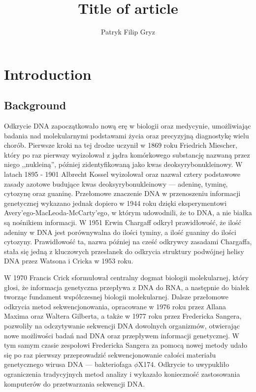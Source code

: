 \documentclass{article}
\newcommand{\temporary}[1]{
    \begin{tcolorbox}[colframe=red, colback=white, title={\textbf{WERSJA PO POLSKU}}, sharp corners=south]
        #1
    \end{tcolorbox}
}
\begin{document}
    \title{Title of article}
    \author{Patryk Filip Gryz}

    \maketitle

    \clearpage
    \section{Introduction}

        \subsection{Background}

            \temporary{
                Odkrycie DNA zapoczątkowało nową erę w biologii oraz medycynie, umożliwiając badania nad molekularnymi podstawami życia oraz precyzyjną diagnostykę wielu chorób\cite{Louie:2000}. Pierwsze kroki na tej drodze uczynił w 1869 roku Friedrich Miescher, który po raz pierwszy wyizolował z jądra komórkowego substancję nazwaną przez niego ,,nukleiną''\cite{Dahm:2005}, później zidentyfikowaną jako kwas deoksyrybonukleinowy. W latach 1895 - 1901 Albrecht Kossel wyizolował oraz nazwał cztery podstawowe zasady azotowe budujące kwas deoksyrybonukleinowy — adeninę, tyminę, cytozynę oraz guaninę\cite{Kossel:1893}. Przełomowe znaczenie DNA w przenoszeniu informacji genetycznej wykazano jednak dopiero w 1944 roku dzięki eksperymentowi Avery'ego-MacLeoda-McCarty'ego\cite{Avery:1944}, w którym udowodnili, że to DNA, a nie białka są nośnikiem informacji. W 1951 Erwin Chargaff odkrył prawidłowość, że ilość adeniny w DNA jest porównywalna do ilości tyminy, a ilość guaniny do ilości cytozyny\cite{Chargaff:1952}. Prawidłowość ta, nazwa później na cześć odkrywcy zasadami Chargaffa, stała się jedną z kluczowych przesłanek do odkrycia struktury podwójnej helisy DNA przez Watsona i Cricka w 1953 roku\cite{Watson:1953}.

    W 1970 Francis Crick sformułował centralny dogmat biologii molekularnej\cite{Crick:1970}, który głosi, że informacja genetyczna przepływa z DNA do RNA, a następnie do białek tworząc fundament współczesnej biologii molekularnej. Dalsze przełomowe odkrycia metod sekwencjonowania, opracowane w 1976 roku przez Allana Maxima oraz Waltera Gilberta\cite{Maxam:1977}, a także w 1977 roku przez Fredericka Sangera\cite{Sanger:1977}, pozwoliły na odczytywanie sekwencji DNA dowolnych organizmów, otwierając nowe możliwości badań nad DNA oraz przepływem informacji genetycznej. W tym samym czasie zespołowi Fredericka Sangera za pomocą nowej metody udało się po raz pierwszy przeprowadzić sekwencjonowanie całości materiału genetycznego  wirusa DNA — bakteriofaga $\phi{}$X174\cite{Sanger:1977:2}. Odkrycie to uwypukliło ograniczenia tradycyjnych metod analizy i wykazało konieczność zastosowania komputerów do przetwarzania sekwencji DNA\cite{Staden:1979}.

}
\end{document}
